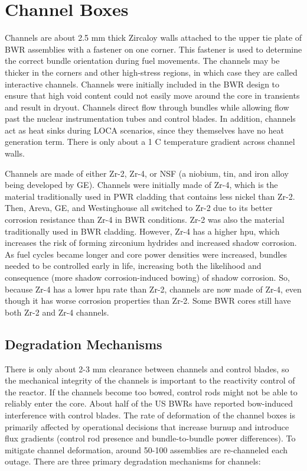 \documentclass[10pt]{article}
\begin{document}
\tableofcontents
\clearpage

\section{Channel Boxes}

Channels are about 2.5 mm thick Zircaloy walls attached to the upper tie plate of BWR assemblies with a fastener on one corner. This fastener is used to determine the correct bundle orientation during fuel movements. The channels may be thicker in the corners and other high-stress regions, in which case they are called interactive channels. Channels were initially included in the BWR design to ensure that high void content could not easily move around the core in transients and result in dryout. Channels direct flow through bundles while allowing flow past the nuclear instrumentation tubes and control blades. In addition, channels act as heat sinks during LOCA scenarios, since they themselves have no heat generation term. There is only about a 1 C temperature gradient across channel walls. 

Channels are made of either Zr-2, Zr-4, or NSF (a niobium, tin, and iron alloy being developed by GE). Channels were initially made of Zr-4, which is the material traditionally used in PWR cladding that contains less nickel than Zr-2. Then, Areva, GE, and Westinghouse all switched to Zr-2 due to its better corrosion resistance than Zr-4 in BWR conditions. Zr-2 was also the material traditionally used in BWR cladding. However, Zr-4 has a higher \gls{hpu}, which increases the risk of forming zirconium hydrides and increased shadow corrosion. As fuel cycles became longer and core power densities were increased, bundles needed to be controlled early in life, increasing both the likelihood and consequence (more shadow corrosion-induced bowing) of shadow corrosion. So, because Zr-4 has a lower \gls{hpu} rate than Zr-2, channels are now made of Zr-4, even though it has worse corrosion properties than Zr-2. Some BWR cores still have both Zr-2 and Zr-4 channels. 

\subsection{Degradation Mechanisms}

There is only about 2-3 mm clearance between channels and control blades, so the mechanical integrity of the channels is important to the reactivity control of the reactor. If the channels become too bowed, control rods might not be able to reliably enter the core. About half of the US BWRs have reported bow-induced interference with control blades. The rate of deformation of the channel boxes is primarily affected by operational decisions that increase burnup and introduce flux gradients (control rod presence and bundle-to-bundle power differences). To mitigate channel deformation, around 50-100 assemblies are re-channeled each outage. There are three primary degradation mechanisms for channels:
\end{document}
